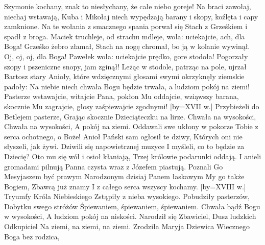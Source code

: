 \beginchorus
Szymonie kochany, znak to niesłychany,
że całe niebo goreje!
Na braci zawołaj, niechaj wstawają,
Kuba i Mikołaj niech wypędzają
barany i skopy, koźlęta i capy zamknione.
\endchorus
\beginverse
Na te wołania z smacznego spania
porwał się Stach z Grześkiem i spadł z broga.
Maciek truchleje, od strachu mdleje,
woła: uciekajcie, ach, dla Boga!
\endverse
\beginchorus
Grześko żebro złamał, Stach na nogę chromał,
bo ją w kolanie wywinął.
Oj, oj, oj, dla Boga! Pawełek woła:
uciekajcie prędko, gore stodoła!
Pogorzały szopy i pszeniczne snopy, jam zginął!
\endchorus
\beginverse
Leżąc w stodole, patrząc na pole,
ujrzał Bartosz stary Anioły,
które wdzięcznymi głosami swymi
okrzyknęły ziemskie padoły:
\endverse
\beginchorus
Na niebie niech chwała Bogu będzie trwała,
a ludziom pokój na ziemi!
Pasterze wstawajcie, witajcie Pana,
pokłon Mu oddajcie, wziąwszy barana,
skocznie Mu zagrajcie, głosy zaśpiewajcie zgodnymi!
\endchorus
\endsong
[by={XVII w.}]
\beginverse
    Przybieżeli do Betlejem pasterze,
    Grając skocznie Dzieciąteczku na lirze.
\endverse
\beginchorus
	Chwała na wysokości,
	Chwała na wysokości,
	A pokój na ziemi.
\endchorus
\beginverse
    Oddawali swe ukłony w pokorze
    Tobie z serca ochotnego, o Boże!
\endverse
\beginverse
    Anioł Pański sam ogłosił te dziwy,
    Których oni nie słyszeli, jak żywi.
\endverse
\beginverse
    Dziwili się napowietrznej muzyce
    I myśleli, co to będzie za Dziecię?
\endverse
\beginverse
    Oto mu się wół i osioł kłaniają,
    Trzej królowie podarunki oddają.
\endverse
\beginverse
    I anieli gromadami pilnują
    Panna czysta wraz z Józefem piastują.
\endverse
\beginverse
    Poznali Go Mesyjaszem być prawym
    Narodzonym dzisiaj Panem łaskawym
\endverse
\beginverse
    My go także Bogiem, Zbawcą już znamy
    I z całego serca wszyscy kochamy.
\endverse
\endsong
[by={XVIII w.}]
\beginverse
    Tryumfy Króla Niebieskiego
    Zstąpiły z nieba wysokiego.
\endverse
\beginchorus
    Pobudziły pasterzów,
    Dobytku swego stróżów
    Śpiewaniem, śpiewaniem, śpiewaniem.
\endchorus
\beginverse
    Chwała bądź Bogu w wysokości,
    A ludziom pokój na niskości.
\endverse
\beginchorus
    Narodził się Zbawiciel,
    Dusz ludzkich Odkupiciel
    Na ziemi, na ziemi, na ziemi.
\endchorus
\beginverse
    Zrodziła Maryja Dziewica
    Wiecznego Boga bez rodzica,
\endverse
\beginchorus
